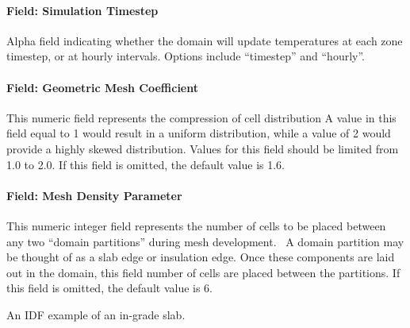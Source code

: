 \paragraph{Field: Simulation Timestep}\label{field-simulation-timestep}

Alpha field indicating whether the domain will update temperatures at each zone timestep, or at hourly intervals. Options include ``timestep'' and ``hourly''.

\paragraph{Field: Geometric Mesh Coefficient}

This numeric field represents the compression of cell distribution A value in this field equal to 1 would result in a uniform distribution, while a value of 2 would provide a highly skewed distribution. Values for this field should be limited from 1.0 to 2.0. If this field is omitted, the default value is 1.6.

\paragraph{Field: Mesh Density Parameter}

This numeric integer field represents the number of cells to be placed between any two ``domain partitions'' during mesh development.~ A domain partition may be thought of as a slab edge or insulation edge. Once these components are laid out in the domain, this field number of cells are placed between the partitions. If this field is omitted, the default value is 6.

An IDF example of an in-grade slab.

